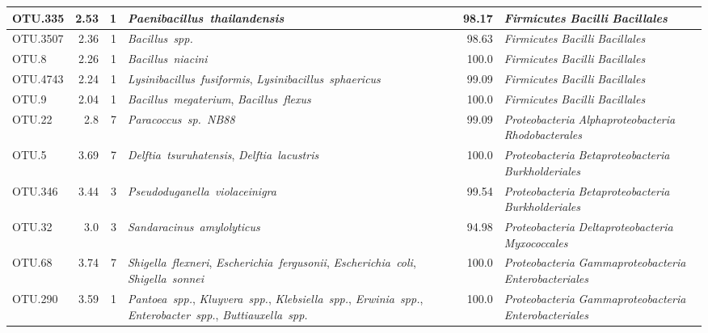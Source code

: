\begin{ThreePartTable}
\begin{longtable}{lrrP{5cm}rP{5cm}}
OTU.335 & 2.53 & 1 & \mbox{\textit{Paenibacillus thailandensis}} & 98.17 & \mbox{\textit{Firmicutes}} \mbox{\textit{Bacilli}} \mbox{\textit{Bacillales}} \\ \midrule
OTU.3507 & 2.36 & 1 & \mbox{\textit{Bacillus spp.}} & 98.63 & \mbox{\textit{Firmicutes}} \mbox{\textit{Bacilli}} \mbox{\textit{Bacillales}} \\ \midrule
OTU.8 & 2.26 & 1 & \mbox{\textit{Bacillus niacini}} & 100.0 & \mbox{\textit{Firmicutes}} \mbox{\textit{Bacilli}} \mbox{\textit{Bacillales}} \\ \midrule
OTU.4743 & 2.24 & 1 & \mbox{\textit{Lysinibacillus fusiformis}}, \mbox{\textit{Lysinibacillus sphaericus}} & 99.09 & \mbox{\textit{Firmicutes}} \mbox{\textit{Bacilli}} \mbox{\textit{Bacillales}} \\ \midrule
OTU.9 & 2.04 & 1 & \mbox{\textit{Bacillus megaterium}}, \mbox{\textit{Bacillus flexus}} & 100.0 & \mbox{\textit{Firmicutes}} \mbox{\textit{Bacilli}} \mbox{\textit{Bacillales}} \\ \midrule
OTU.22 & 2.8 & 7 & \mbox{\textit{Paracoccus sp. NB88}} & 99.09 & \mbox{\textit{Proteobacteria}} \mbox{\textit{Alphaproteobacteria}} \mbox{\textit{Rhodobacterales}} \\ \midrule
OTU.5 & 3.69 & 7 & \mbox{\textit{Delftia tsuruhatensis}}, \mbox{\textit{Delftia lacustris}} & 100.0 & \mbox{\textit{Proteobacteria}} \mbox{\textit{Betaproteobacteria}} \mbox{\textit{Burkholderiales}} \\ \midrule
OTU.346 & 3.44 & 3 & \mbox{\textit{Pseudoduganella violaceinigra}} & 99.54 & \mbox{\textit{Proteobacteria}} \mbox{\textit{Betaproteobacteria}} \mbox{\textit{Burkholderiales}} \\ \midrule
OTU.32 & 3.0 & 3 & \mbox{\textit{Sandaracinus amylolyticus}} & 94.98 & \mbox{\textit{Proteobacteria}} \mbox{\textit{Deltaproteobacteria}} \mbox{\textit{Myxococcales}} \\ \midrule
OTU.68 & 3.74 & 7 & \mbox{\textit{Shigella flexneri}}, \mbox{\textit{Escherichia fergusonii}}, \mbox{\textit{Escherichia coli}}, \mbox{\textit{Shigella sonnei}} & 100.0 & \mbox{\textit{Proteobacteria}} \mbox{\textit{Gammaproteobacteria}} \mbox{\textit{Enterobacteriales}} \\ \midrule
OTU.290 & 3.59 & 1 & \mbox{\textit{Pantoea spp.}}, \mbox{\textit{Kluyvera spp.}}, \mbox{\textit{Klebsiella spp.}}, \mbox{\textit{Erwinia spp.}}, \mbox{\textit{Enterobacter spp.}}, \mbox{\textit{Buttiauxella spp.}} & 100.0 & \mbox{\textit{Proteobacteria}} \mbox{\textit{Gammaproteobacteria}} \mbox{\textit{Enterobacteriales}} \\ \midrule

\end{longtable}
\end{ThreePartTable}
